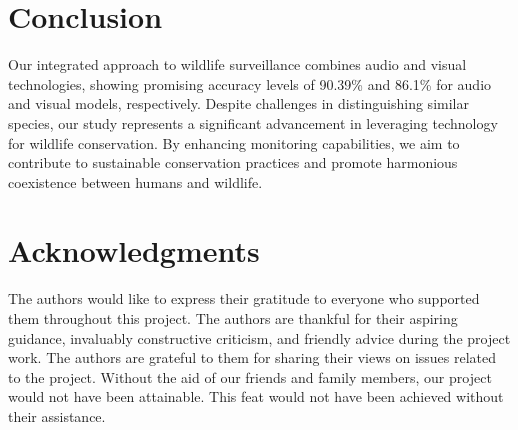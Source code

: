 \documentclass[fleqn, 10pt, twoside]{IOEGC}
\begin{document}
\section{Conclusion}
Our integrated approach to wildlife surveillance combines audio and visual technologies, showing promising accuracy levels of 90.39\% and 86.1\% for audio and visual models, respectively. Despite challenges in distinguishing similar species, our study represents a significant advancement in leveraging technology for wildlife conservation. By enhancing monitoring capabilities, we aim to contribute to sustainable conservation practices and promote harmonious coexistence between humans and wildlife.



\section*{Acknowledgments}
The authors would like to express their gratitude to everyone who supported
them throughout this project. The authors are thankful for their aspiring guidance,
invaluably constructive criticism, and friendly advice during the project work. The authors are
grateful to them for sharing their views on issues related to the project. Without the aid
of our friends and family members, our project would not have been attainable. This
feat would not have been achieved without their assistance.













\vfill\null
\end{document}

